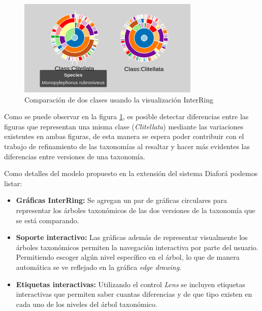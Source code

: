 \documentclass[journal]{IEEEtran}
\begin{document}
\begin{figure}
  \centering
  \includegraphics[]{interringCompare.png}
  \caption{Comparación de dos clases usando la visualización InterRing}
  \label{class_compare}
\end{figure}

Como se puede observar en la figura \ref{class_compare}, es posible detectar diferencias entre las figuras que representan una misma clase (\emph{Clitellata})
mediante las variaciones existentes en ambas figuras, de esta manera se espera poder contribuir con el trabajo de refinamiento de las taxonomías al 
resaltar y hacer más evidentes las diferencias entre versiones de una taxonomía.

Como detalles del modelo propuesto en la extensión del sistema Diaforá podemos listar:

\begin{itemize}
  \item \textbf{Gráficas InterRing:} Se agregan un par de gráficas circulares para representar los árboles taxonómicos de las
  dos versiones de la taxonomía que se está comparando.
  \item  \textbf{Soporte interactivo:} Las gráficas además de representar visualmente los árboles taxonómicos permiten la navegación interactiva
  por parte del usuario. Permitiendo escoger algún nivel específico en el árbol, lo que de manera automática se ve reflejado en la gráfica \emph{edge drawing}.
  \item \textbf{Etiquetas interactivas:} Utilizando el control \emph{Lens} se incluyen etiquetas interactivas que permiten saber cuantas diferencias y de que tipo existen
  en cada uno de los niveles del árbol taxonómico.
\end{itemize}
\end{document}
